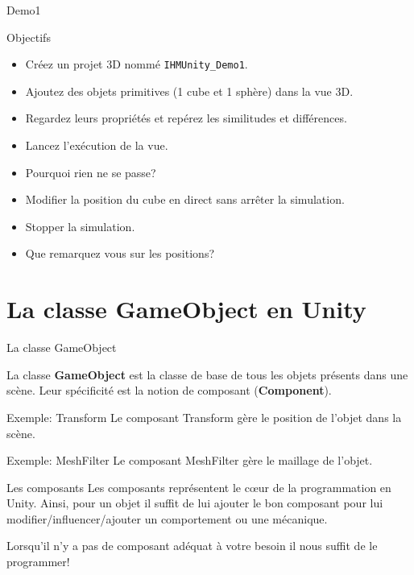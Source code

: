 \begin{frame}{Demo1}
	\vfill
	\begin{block}{Objectifs}
	\begin{itemize}
		\item Créez un projet 3D nommé \texttt{IHMUnity\_Demo1}.
		\item Ajoutez des objets primitives (1 cube et 1 sphère) dans la vue 3D.
		\item Regardez leurs propriétés et repérez les similitudes et différences.
		\item Lancez l'exécution de la vue.
		\item Pourquoi rien ne se passe?
		\item Modifier la position du cube en direct sans arrêter la simulation.
		\item Stopper la simulation.
		\item Que remarquez vous sur les positions?
	\end{itemize}
	\end{block}
	\vfill
\end{frame}

\section{La classe GameObject en Unity}

\begin{frame}{La classe GameObject}
	
	\begin{definition}
		La classe \textbf{GameObject} est la classe de base de tous les objets présents dans une scène. Leur spécificité est la notion de composant (\textbf{Component}).
	\end{definition}

	\begin{exampleblock}{Exemple: Transform}
		Le composant Transform gère le position de l'objet dans la scène.
	\end{exampleblock}

	\begin{exampleblock}{Exemple: MeshFilter}
	Le composant MeshFilter gère le maillage de l'objet.
\end{exampleblock}

\begin{alertblock}{Les composants}
	Les composants représentent le c\oe ur de la programmation en Unity. Ainsi, pour un objet il suffit de lui ajouter le bon composant pour lui modifier/influencer/ajouter un comportement ou une mécanique.
	
	Lorsqu'il n'y a pas de composant adéquat à votre besoin il nous suffit de le \alert{programmer}!
\end{alertblock}
	
\end{frame}


